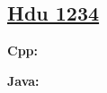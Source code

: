 \subsection{\href{https://www.weblink.com}{Hdu 1234}}\label{app:codelist:hdu:1234}

\textbf{Cpp:}\par


\textbf{Java:}\par


